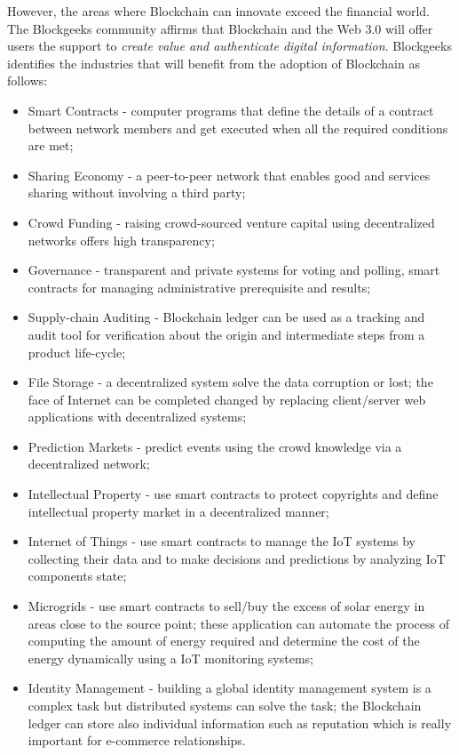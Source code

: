 However, the areas where Blockchain can innovate exceed the financial world. The Blockgeeks community \cite{blockgeeks} affirms that Blockchain and the Web 3.0 will offer users the support to \emph{create value and authenticate digital information}.
Blockgeeks identifies the industries that will benefit from the adoption of Blockchain as follows:
\begin{itemize}
	\item Smart Contracts - computer programs that define the details of a contract between network members and get executed when all the required conditions are met;
	\item Sharing Economy - a peer-to-peer network that enables good and services sharing without involving a third party;
	\item Crowd Funding - raising crowd-sourced venture capital using decentralized networks offers high transparency;
	\item Governance - transparent and private systems for voting and polling, smart contracts for managing administrative prerequisite and results;
	\item Supply-chain Auditing - Blockchain ledger can be used as a tracking and audit tool for verification about the origin and intermediate steps from a product life-cycle;
	\item File Storage - a decentralized system solve the data corruption or lost; the face of Internet can be completed changed by replacing client/server web applications with decentralized systems;
	\item Prediction Markets - predict events using the crowd knowledge via a decentralized network;
	\item Intellectual Property - use smart contracts to protect copyrights and define intellectual property market in a decentralized manner;
	\item Internet of Things - use smart contracts to manage the IoT systems by collecting their data and to make decisions and predictions by analyzing IoT components state;
	\item Microgrids - use smart contracts to sell/buy the excess of solar energy in areas close to the source point; these application can automate the process of computing the amount of energy required and determine the cost of the energy dynamically using a IoT monitoring systems; 
	\item Identity Management - building a global identity management system is a complex task but distributed systems can solve the task; the Blockchain ledger can store also individual information such as reputation which is really important for e-commerce relationships. 

\end{itemize}
